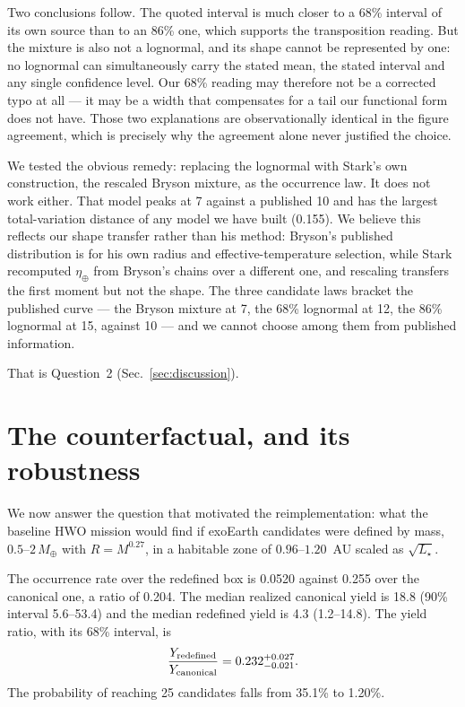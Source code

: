 \documentclass[11pt,a4paper]{article}
\begin{document}
Two conclusions follow. The quoted interval is much closer to a 68\% interval of its own source
than to an 86\% one, which supports the transposition reading. But the mixture is also not a
lognormal, and its shape cannot be represented by one: no lognormal can simultaneously carry the
stated mean, the stated interval and any single confidence level. Our 68\% reading may therefore
not be a corrected typo at all --- it may be a width that compensates for a tail our functional
form does not have. Those two explanations are observationally identical in the figure agreement,
which is precisely why the agreement alone never justified the choice.

We tested the obvious remedy: replacing the lognormal with Stark's own construction, the rescaled
Bryson mixture, as the occurrence law. It does not work either. That model peaks at 7
against a published 10 and has the largest total-variation distance of any model we have
built (0.155). We believe this reflects our shape transfer rather than his method:
Bryson's published distribution is for his own radius and effective-temperature selection, while
Stark recomputed $\eta_\oplus$ from Bryson's chains over a different one, and rescaling transfers
the first moment but not the shape. The three candidate laws bracket the published curve --- the
Bryson mixture at 7, the 68\% lognormal at 12, the 86\% lognormal at
15, against 10 --- and we cannot choose among them from published information.

That is Question~2 (Sec.~\ref{sec:discussion}).

\section{The counterfactual, and its robustness}
\label{sec:result}

We now answer the question that motivated the reimplementation: what the baseline HWO mission
would find if exoEarth candidates were defined by mass, $0.5$--$2\,M_\oplus$ with $R = M^{0.27}$,
in a habitable zone of $0.96$--$1.20$~AU scaled as $\sqrt{L_\star}$.

The occurrence rate over the redefined box is 0.0520 against 0.255 over the canonical
one, a ratio of 0.204. The median realized canonical yield is 18.8 (90\% interval
5.6--53.4) and the median redefined yield is 4.3
(1.2--14.8). The yield ratio, with its 68\% interval, is
\[
  \frac{Y_{\rm redefined}}{Y_{\rm canonical}} = 0.232^{+0.027}_{-0.021}.
\]
The probability of reaching 25 candidates falls from 35.1\% to 1.20\%.
\end{document}
